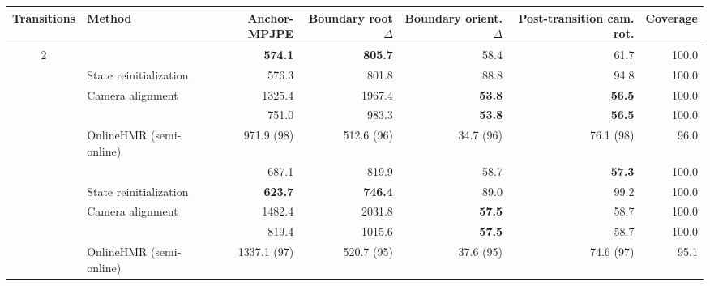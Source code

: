 \begin{tabular}{clrrrrr}
\toprule
Transitions & Method & Anchor-MPJPE & Boundary root $\Delta$ & Boundary orient. $\Delta$ & Post-transition cam. rot. & Coverage \\
\midrule
\multirow{5}{*}{2}
 & \humanthree{} & \textbf{574.1} & \textbf{805.7} & 58.4 & 61.7 & 100.0 \\
 & State reinitialization & 576.3 & 801.8 & 88.8 & 94.8 & 100.0 \\
 & Camera alignment & 1325.4 & 1967.4 & \textbf{53.8} & \textbf{56.5} & 100.0 \\
 & \method{} & 751.0 & 983.3 & \textbf{53.8} & \textbf{56.5} & 100.0 \\
 & OnlineHMR (semi-online) & 971.9 (98) & 512.6 (96) & 34.7 (96) & 76.1 (98) & 96.0 \\
\addlinespace
\multirow{5}{*}{3}
 & \humanthree{} & 687.1 & 819.9 & 58.7 & \textbf{57.3} & 100.0 \\
 & State reinitialization & \textbf{623.7} & \textbf{746.4} & 89.0 & 99.2 & 100.0 \\
 & Camera alignment & 1482.4 & 2031.8 & \textbf{57.5} & 58.7 & 100.0 \\
 & \method{} & 819.4 & 1015.6 & \textbf{57.5} & 58.7 & 100.0 \\
 & OnlineHMR (semi-online) & 1337.1 (97) & 520.7 (95) & 37.6 (95) & 74.6 (97) & 95.1 \\
\bottomrule
\end{tabular}
